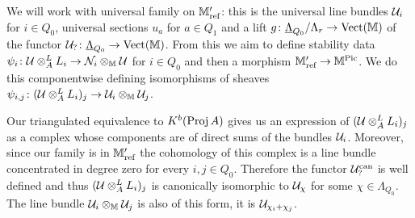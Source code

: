 \documentclass[12pt]{amsart}
\begin{document}

We will work with universal family on $\mathbb{M}_\text{ref}'$: this is the universal line bundles $\mathcal{U}_i$ for $i \in Q_0$, universal sections $u_a$ for $a \in Q_1$ and a lift $g \colon \underline{\Lambda}_{Q_0}/\Lambda_r \rightarrow \operatorname{Vect}(\mathbb{M})$ of the functor $\mathcal{U}_? \colon \underline{\Lambda}_{Q_0} \rightarrow \operatorname{Vect}(\mathbb{M})$.
From this we aim to define stability data $\psi_i \colon \mathcal{U} \otimes_A^L L_i \rightarrow \mathcal{N}_i \otimes_{\mathbb{M}} \mathcal{U}$ for $i\in Q_0$ and then a morphism $\mathbb{M}_\text{ref}' \rightarrow \mathbb{M}^{\operatorname{Pic}}$.
We do this componentwise defining isomorphisms of sheaves $\psi_{i,j} \colon (\mathcal{U} \otimes_A^L L_i)_j \rightarrow \mathcal{U}_i \otimes_{\mathbb{M}} \mathcal{U}_j$.

Our triangulated equivalence to $K^b(\operatorname{Proj} A)$ gives us an expression of $(\mathcal{U} \otimes_A^L L_i)_j$ as a complex whose components are of direct sums of the bundles $\mathcal{U}_i$.
Moreover, since our family is in $\mathbb{M}_\text{ref}'$ the cohomology of this complex is a line bundle concentrated in degree zero for every $i,j \in Q_0$.
Therefore the functor $\mathcal{U}_?^\text{can}$ is well defined and thus $(\mathcal{U} \otimes_A^L L_i)_j$ is canonically isomorphic to $\mathcal{U}_{\chi}$ for some $\chi \in \Lambda_{Q_0}$.
The line bundle $\mathcal{U}_i \otimes_{\mathbb{M}} \mathcal{U}_j$ is also of this form, it is $\mathcal{U}_{\chi_i+\chi_j}$.
\end{document}

